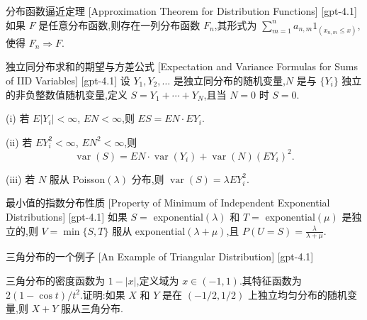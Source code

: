\documentclass[UTF8]{ctexart}
\begin{document}
    
    
    \begin{thm}
        {分布函数逼近定理}
        [Approximation Theorem for Distribution Functions]
        [gpt-4.1]
        如果 $F$ 是任意分布函数,则存在一列分布函数 $F_n$,其形式为 $\sum_{m=1}^n a_{n,m} 1_{(x_{n,m} \leq x)}$,使得 $F_n \Rightarrow F$.

    \end{thm}
    
    
    
    \begin{thm}
        {独立同分布求和的期望与方差公式}
        [Expectation and Variance Formulas for Sums of IID Variables]
        [gpt-4.1]
        设 $Y_1, Y_2, \ldots$ 是独立同分布的随机变量,$N$ 是与 $\{Y_i\}$ 独立的非负整数值随机变量,定义 $S = Y_1 + \cdots + Y_N$,且当 $N = 0$ 时 $S = 0$.

(i) 若 $E|Y_i| < \infty$, $EN < \infty$,则 $ES = EN \cdot E Y_i$.

(ii) 若 $E Y_i^2 < \infty$, $EN^2 < \infty$,则
\[
\operatorname{var}(S) = EN \cdot \operatorname{var}(Y_i) + \operatorname{var}(N) (E Y_i)^2.
\]

(iii) 若 $N$ 服从 Poisson$(\lambda)$ 分布,则 $\operatorname{var}(S) = \lambda E Y_i^2$.

    \end{thm}
    
    
    
    \begin{thm}
        {最小值的指数分布性质}
        [Property of Minimum of Independent Exponential Distributions]
        [gpt-4.1]
        如果 $S =$ exponential$(\lambda)$ 和 $T =$ exponential$(\mu)$ 是独立的,则 $V = \operatorname*{min}\{S, T\}$ 服从 exponential$(\lambda + \mu)$,且 $P(U = S) = \frac{\lambda}{\lambda + \mu}$.
    \end{thm}
    
    
    
    \begin{xmp}
        {三角分布的一个例子}
        [An Example of Triangular Distribution]
        [gpt-4.1]
        
三角分布的密度函数为 $1 - |x|$,定义域为 $x \in (-1, 1)$.其特征函数为 $2 (1 - \cos t) / t^{2}$.证明:如果 $X$ 和 $Y$ 是在 $(-1/2, 1/2)$ 上独立均匀分布的随机变量,则 $X + Y$ 服从三角分布.

    \end{xmp}
    
\end{document}
